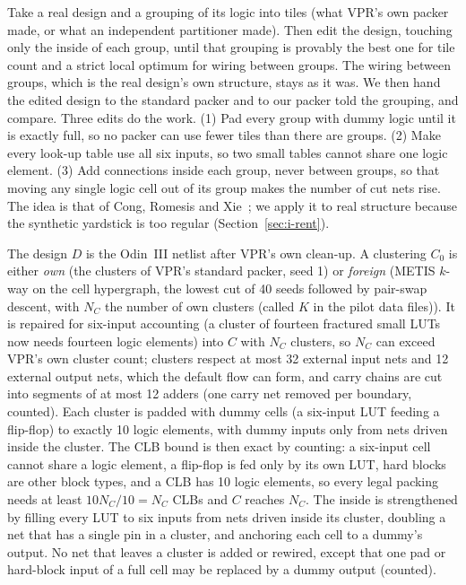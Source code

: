  Take a real design and a grouping of its logic into tiles (what VPR's own packer made, or what an independent partitioner made). Then edit the design, touching only the inside of each group, until that grouping is provably the best one for tile count and a strict local optimum for wiring between groups. The wiring between groups, which is the real design's own structure, stays as it was. We then hand the edited design to the standard packer and to our packer told the grouping, and compare. Three edits do the work. (1) Pad every group with dummy logic until it is exactly full, so no packer can use fewer tiles than there are groups. (2) Make every look-up table use all six inputs, so two small tables cannot share one logic element. (3) Add connections inside each group, never between groups, so that moving any single logic cell out of its group makes the number of cut nets rise. The idea is that of Cong, Romesis and Xie~\cite{Cong03tpeko}; we apply it to real structure because the synthetic yardstick is too regular (Section~\ref{sec:i-rent}).

 The design $D$ is the Odin~III netlist after VPR's own clean-up. A clustering $C_0$ is either \emph{own} (the clusters of VPR's standard packer, seed 1) or \emph{foreign} (METIS $k$-way on the cell hypergraph, the lowest cut of 40 seeds followed by pair-swap descent, with $N_C$ the number of own clusters (called $K$ in the pilot data files)). It is repaired for six-input accounting (a cluster of fourteen fractured small LUTs now needs fourteen logic elements) into $C$ with $N_C$ clusters, so $N_C$ can exceed VPR's own cluster count; clusters respect at most 32 external input nets and 12 external output nets, which the default flow can form, and carry chains are cut into segments of at most 12 adders (one carry net removed per boundary, counted). Each cluster is padded with dummy cells (a six-input LUT feeding a flip-flop) to exactly 10 logic elements, with dummy inputs only from nets driven inside the cluster. The CLB bound is then exact by counting: a six-input cell cannot share a logic element, a flip-flop is fed only by its own LUT, hard blocks are other block types, and a CLB has 10 logic elements, so every legal packing needs at least $10N_C/10=N_C$ CLBs and $C$ reaches $N_C$. The inside is strengthened by filling every LUT to six inputs from nets driven inside its cluster, doubling a net that has a single pin in a cluster, and anchoring each cell to a dummy's output. No net that leaves a cluster is added or rewired, except that one pad or hard-block input of a full cell may be replaced by a dummy output (counted).

